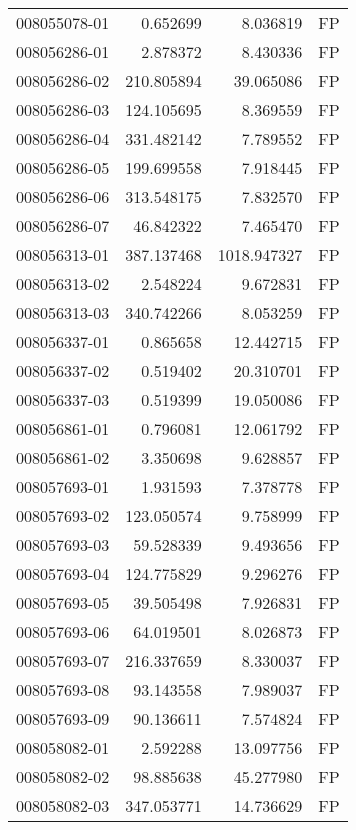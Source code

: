 \begin{tabular}{lrrl}
008055078-01 &    0.652699 &       8.036819 &   FP \\
008056286-01 &    2.878372 &       8.430336 &   FP \\
008056286-02 &  210.805894 &      39.065086 &   FP \\
008056286-03 &  124.105695 &       8.369559 &   FP \\
008056286-04 &  331.482142 &       7.789552 &   FP \\
008056286-05 &  199.699558 &       7.918445 &   FP \\
008056286-06 &  313.548175 &       7.832570 &   FP \\
008056286-07 &   46.842322 &       7.465470 &   FP \\
008056313-01 &  387.137468 &    1018.947327 &   FP \\
008056313-02 &    2.548224 &       9.672831 &   FP \\
008056313-03 &  340.742266 &       8.053259 &   FP \\
008056337-01 &    0.865658 &      12.442715 &   FP \\
008056337-02 &    0.519402 &      20.310701 &   FP \\
008056337-03 &    0.519399 &      19.050086 &   FP \\
008056861-01 &    0.796081 &      12.061792 &   FP \\
008056861-02 &    3.350698 &       9.628857 &   FP \\
008057693-01 &    1.931593 &       7.378778 &   FP \\
008057693-02 &  123.050574 &       9.758999 &   FP \\
008057693-03 &   59.528339 &       9.493656 &   FP \\
008057693-04 &  124.775829 &       9.296276 &   FP \\
008057693-05 &   39.505498 &       7.926831 &   FP \\
008057693-06 &   64.019501 &       8.026873 &   FP \\
008057693-07 &  216.337659 &       8.330037 &   FP \\
008057693-08 &   93.143558 &       7.989037 &   FP \\
008057693-09 &   90.136611 &       7.574824 &   FP \\
008058082-01 &    2.592288 &      13.097756 &   FP \\
008058082-02 &   98.885638 &      45.277980 &   FP \\
008058082-03 &  347.053771 &      14.736629 &   FP \\

\end{tabular}
